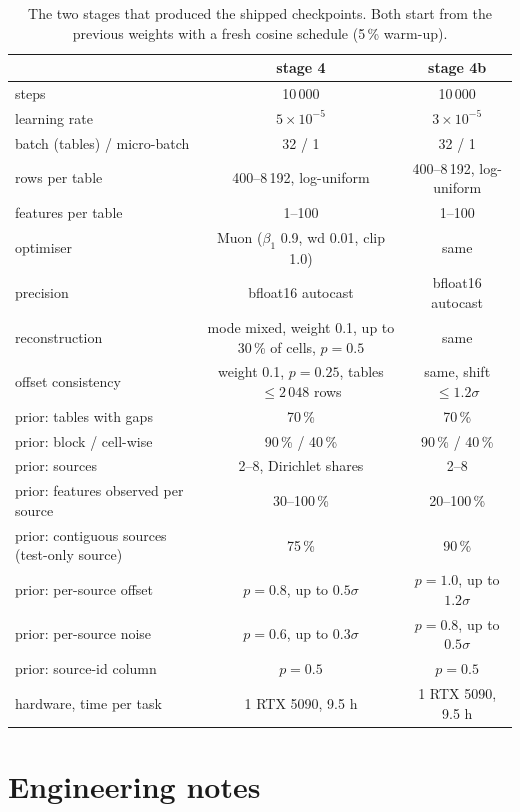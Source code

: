 \documentclass[11pt]{article}
\begin{document}
\begin{table}[!htbp]
\centering\footnotesize
\caption{The two stages that produced the shipped checkpoints. Both start from the
previous weights with a fresh cosine schedule (5\,\% warm-up).}
\begin{tabular}{lcc}
\toprule
& stage 4 & stage 4b\\
\midrule
steps & 10\,000 & 10\,000\\
learning rate & $5\times10^{-5}$ & $3\times10^{-5}$\\
batch (tables) / micro-batch & 32 / 1 & 32 / 1\\
rows per table & 400--8\,192, log-uniform & 400--8\,192, log-uniform\\
features per table & 1--100 & 1--100\\
optimiser & Muon ($\beta_1$ 0.9, wd 0.01, clip 1.0) & same\\
precision & bfloat16 autocast & bfloat16 autocast\\
reconstruction & mode mixed, weight 0.1, up to 30\,\% of cells, $p=0.5$ & same\\
offset consistency & weight 0.1, $p=0.25$, tables $\le 2\,048$ rows & same, shift $\le 1.2\sigma$\\
\midrule
prior: tables with gaps & 70\,\% & 70\,\%\\
prior: block / cell-wise & 90\,\% / 40\,\% & 90\,\% / 40\,\%\\
prior: sources & 2--8, Dirichlet shares & 2--8\\
prior: features observed per source & 30--100\,\% & 20--100\,\%\\
prior: contiguous sources (test-only source) & 75\,\% & 90\,\%\\
prior: per-source offset & $p=0.8$, up to $0.5\sigma$ & $p=1.0$, up to $1.2\sigma$\\
prior: per-source noise & $p=0.6$, up to $0.3\sigma$ & $p=0.8$, up to $0.5\sigma$\\
prior: source-id column & $p=0.5$ & $p=0.5$\\
\midrule
hardware, time per task & 1 RTX 5090, 9.5 h & 1 RTX 5090, 9.5 h\\
\bottomrule
\end{tabular}
\end{table}
\FloatBarrier

\section{Engineering notes}
\label{app:eng}
\end{document}
